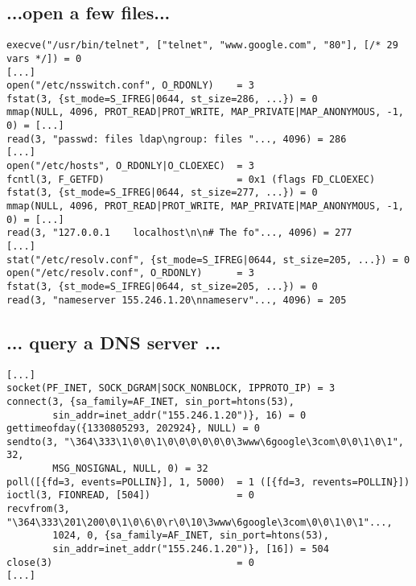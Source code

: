 \documentclass[xga]{xdvislides}
\begin{document}


\subsection{...open a few files...}
\begin{verbatim}
execve("/usr/bin/telnet", ["telnet", "www.google.com", "80"], [/* 29 vars */]) = 0
[...]
open("/etc/nsswitch.conf", O_RDONLY)    = 3
fstat(3, {st_mode=S_IFREG|0644, st_size=286, ...}) = 0
mmap(NULL, 4096, PROT_READ|PROT_WRITE, MAP_PRIVATE|MAP_ANONYMOUS, -1, 0) = [...]
read(3, "passwd: files ldap\ngroup: files "..., 4096) = 286
[...]
open("/etc/hosts", O_RDONLY|O_CLOEXEC)  = 3
fcntl(3, F_GETFD)                       = 0x1 (flags FD_CLOEXEC)
fstat(3, {st_mode=S_IFREG|0644, st_size=277, ...}) = 0
mmap(NULL, 4096, PROT_READ|PROT_WRITE, MAP_PRIVATE|MAP_ANONYMOUS, -1, 0) = [...]
read(3, "127.0.0.1    localhost\n\n# The fo"..., 4096) = 277
[...]
stat("/etc/resolv.conf", {st_mode=S_IFREG|0644, st_size=205, ...}) = 0
open("/etc/resolv.conf", O_RDONLY)      = 3
fstat(3, {st_mode=S_IFREG|0644, st_size=205, ...}) = 0
read(3, "nameserver 155.246.1.20\nnameserv"..., 4096) = 205
\end{verbatim}

\subsection{... query a DNS server ...}
\begin{verbatim}
[...]
socket(PF_INET, SOCK_DGRAM|SOCK_NONBLOCK, IPPROTO_IP) = 3
connect(3, {sa_family=AF_INET, sin_port=htons(53),
        sin_addr=inet_addr("155.246.1.20")}, 16) = 0
gettimeofday({1330805293, 202924}, NULL) = 0
sendto(3, "\364\333\1\0\0\1\0\0\0\0\0\0\3www\6google\3com\0\0\1\0\1", 32,
        MSG_NOSIGNAL, NULL, 0) = 32
poll([{fd=3, events=POLLIN}], 1, 5000)  = 1 ([{fd=3, revents=POLLIN}])
ioctl(3, FIONREAD, [504])               = 0
recvfrom(3, "\364\333\201\200\0\1\0\6\0\r\0\10\3www\6google\3com\0\0\1\0\1"...,
        1024, 0, {sa_family=AF_INET, sin_port=htons(53),
        sin_addr=inet_addr("155.246.1.20")}, [16]) = 504
close(3)                                = 0
[...]
\end{verbatim}
\end{document}

